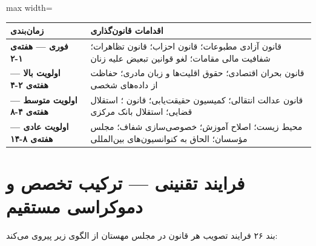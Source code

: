 \documentclass[12pt,a4paper,twoside,openany]{book}
\begin{document}
	\vspace{0.5\baselineskip}
	\noindent
	\begin{adjustbox}{max width=\linewidth}
		\begin{tabular}{@{}lp{8cm}@{}}
			\toprule
			\textbf{زمان‌بندی} & \textbf{اقدامات قانون‌گذاری} \\
			\midrule
			\rowcolor{DangerBg}
			\textbf{فوری --- هفته‌ی ۱-۲} &
			قانون آزادی مطبوعات؛ قانون احزاب؛ قانون تظاهرات؛ شفافیت مالی مقامات؛
			لغو قوانین تبعیض علیه زنان \\
			\addlinespace
			\rowcolor{WarningBg}
			\textbf{اولویت بالا --- هفته‌ی ۲-۴} &
			قانون بحران اقتصادی؛ حقوق اقلیت‌ها و زبان مادری؛ حفاظت از داده‌های شخصی \\
			\addlinespace
			\rowcolor{NodeBg}
			\textbf{اولویت متوسط --- هفته‌ی ۴-۸} &
			قانون عدالت انتقالی؛ کمیسیون حقیقت‌یابی؛ قانون \lr{SSR}؛
			استقلال قضایی؛ استقلال بانک مرکزی \\
			\addlinespace
			\rowcolor{SuccessBg}
			\textbf{اولویت عادی --- هفته‌ی ۸-۱۴} &
			محیط زیست؛ اصلاح آموزش؛ خصوصی‌سازی شفاف؛ مجلس مؤسسان؛
			الحاق به کنوانسیون‌های بین‌المللی \\
			\bottomrule
		\end{tabular}
	\end{adjustbox}
	\vspace{0.5\baselineskip}
	
	\section{فرایند تقنینی --- ترکیب تخصص و دموکراسی مستقیم}
	
	\begin{bandbox}{بند ۲۶}
		فرایند تصویب هر قانون در مجلس مهستان از الگوی زیر پیروی می‌کند:
	\end{bandbox}
	
\end{document}
